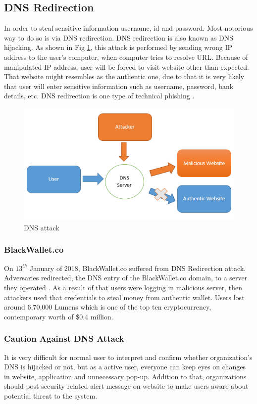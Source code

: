 \documentclass[a4paper,twoside,12pt]{report}
\begin{document}
\begin{spacing}{1.5}
\subsection{DNS Redirection}
\label{dnsattack}
In order to steal sensitive information username, id and password. Most notorious way to do so is via DNS redirection. DNS redirection is also known as DNS hijacking. As shown in Fig \ref{img: dns}, this attack is performed by sending wrong IP address to the user's computer, when computer tries to resolve URL. Because of manipulated IP address, user will be forced to visit website other than expected. That website might resembles as the authentic one, due to that it is very likely that user will enter sensitive information such as 
username, password, bank details, etc. DNS redirection is one type of technical phishing \cite{andryukhinphishing}.
\begin{figure}[h!]
\begin{center}
  \includegraphics[width=0.8\linewidth]{images/dns.png}
  \caption{\fontsize{10}{10}\selectfont DNS attack}
  \label{img: dns}
\end{center}
\end{figure}
\subsubsection{BlackWallet.co}
On $13^{th}$ January of 2018, BlackWallet.co suffered from DNS Redirection attack. Adversaries redirected, the DNS entry of the BlackWallet.co domain, to a server they operated \cite{blackwallet_nodate}. As a result of that users were logging in malicious server, then attackers used that credentials to steal money from authentic wallet. Users lost around 6,70,000 Lumens which is one of the top ten cryptocurrency, contemporary worth of \$0.4 million. 
\subsubsection{Caution Against DNS Attack}
It is very difficult for normal user to interpret and confirm whether organization's DNS is hijacked or not, but as a active user, everyone can keep eyes on changes in website, application and unnecessary pop-up. Addition to that, organizations should post security related alert message on website to make users aware about potential threat to the system.

\end{spacing}
\end{document}
